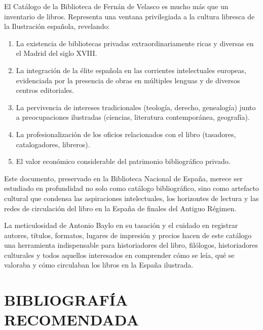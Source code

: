 \documentclass[12pt,a4paper]{article}
\begin{document}
El Catálogo de la Biblioteca de Fernán de Velasco es mucho más que un inventario de libros. Representa una ventana privilegiada a la cultura libresca de la Ilustración española, revelando:

\begin{enumerate}
    \item La existencia de bibliotecas privadas extraordinariamente ricas y diversas en el Madrid del siglo XVIII.
    
    \item La integración de la élite española en las corrientes intelectuales europeas, evidenciada por la presencia de obras en múltiples lenguas y de diversos centros editoriales.
    
    \item La pervivencia de intereses tradicionales (teología, derecho, genealogía) junto a preocupaciones ilustradas (ciencias, literatura contemporánea, geografía).
    
    \item La profesionalización de los oficios relacionados con el libro (tasadores, catalogadores, libreros).
    
    \item El valor económico considerable del patrimonio bibliográfico privado.
\end{enumerate}

Este documento, preservado en la Biblioteca Nacional de España, merece ser estudiado en profundidad no solo como catálogo bibliográfico, sino como artefacto cultural que condensa las aspiraciones intelectuales, los horizontes de lectura y las redes de circulación del libro en la España de finales del Antiguo Régimen.

La meticulosidad de Antonio Baylo en su tasación y el cuidado en registrar autores, títulos, formatos, lugares de impresión y precios hacen de este catálogo una herramienta indispensable para historiadores del libro, filólogos, historiadores culturales y todos aquellos interesados en comprender cómo se leía, qué se valoraba y cómo circulaban los libros en la España ilustrada.

\section*{BIBLIOGRAFÍA RECOMENDADA}
\end{document}
